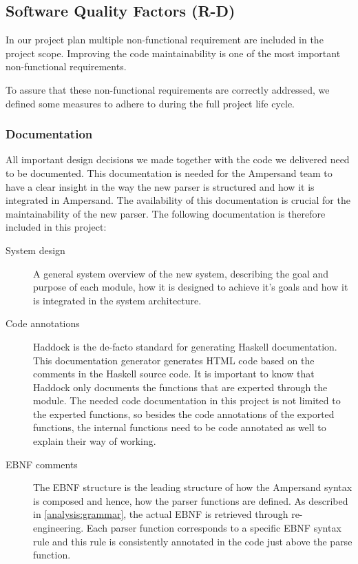 
\subsection{Software Quality Factors (R-D)}
\label{design:software-quality}
In our project plan  multiple non-functional requirement are included in the project scope.
Improving the code maintainability is one of the most important non-functional requirements.

To assure that these non-functional requirements are correctly addressed, we defined some measures to adhere to during the full project life cycle.

\subsubsection{Documentation}
All important design decisions we made together with the code we delivered need to be documented.
This documentation is needed for the Ampersand team to have a clear insight in the way the new parser is structured and how it is integrated in Ampersand.
The availability of this documentation is crucial for the maintainability of the new parser.
The following documentation is therefore included in this project:

\begin{description}
  \item[System design]
    A general system overview of the new system, describing the goal and purpose of each module, how it is designed to achieve it's goals and how it is integrated in the system architecture.
  \item[Code annotations]
    Haddock is the de-facto standard for generating Haskell documentation. 
    This documentation generator generates HTML code based on the comments in the Haskell source code.
    It is important to know that Haddock only documents the functions that are experted through the module.
    The needed code documentation in this project is not limited to the experted functions, so besides the code annotations of the exported functions, the internal functions need to be code annotated as well to explain their way of working.
  \item[EBNF comments]
    The EBNF structure is the leading structure of how the Ampersand syntax is composed and hence, how the parser functions are defined.
    As described in \autoref{analysis:grammar}, the actual EBNF is retrieved through re-engineering.
    Each parser function corresponds to a specific EBNF syntax rule and this rule is consistently annotated in the code just above the parse function.

\end{description}

